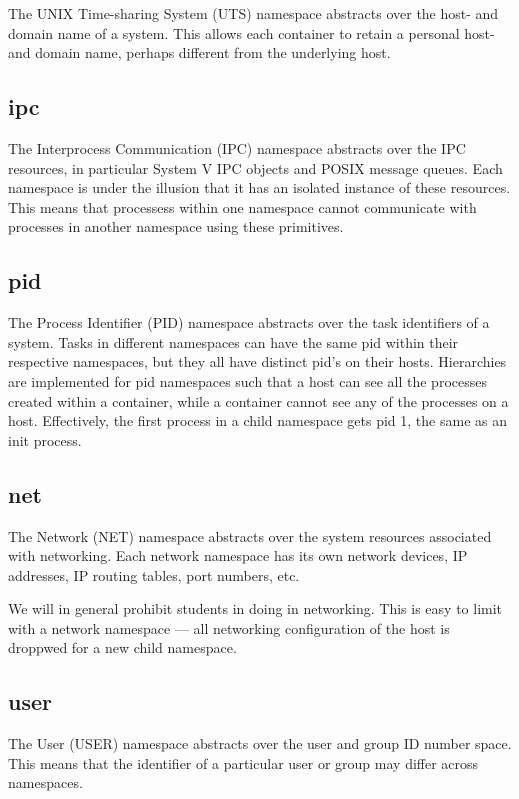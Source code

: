 The UNIX Time-sharing System (UTS) namespace abstracts over the host- and domain
name of a system. This allows each container to retain a personal host- and
domain name, perhaps different from the underlying host.

\subsection{ipc}

The Interprocess Communication (IPC) namespace abstracts over the IPC
resources, in particular System V IPC objects and POSIX message queues. Each
namespace is under the illusion that it has an isolated instance of these
resources. This means that processess within one namespace cannot communicate
with processes in another namespace using these primitives.

\subsection{pid}

The Process Identifier (PID) namespace abstracts over the task identifiers of a
system. Tasks in different namespaces can have the same pid within their
respective namespaces, but they all have distinct pid's on their hosts.
Hierarchies are implemented for pid namespaces such that a host can see all the
processes created within a container, while a container cannot see any of the
processes on a host. Effectively, the first process in a child namespace gets
pid 1, the same as an init process.

\subsection{net}

The Network (NET) namespace abstracts over the system resources associated with
networking. Each network namespace has its own network devices, IP addresses,
IP routing tables, port numbers, etc.

We will in general prohibit students in doing in networking. This is easy to
limit with a network namespace --- all networking configuration of the host is
droppwed for a new child namespace.

\subsection{user}

The User (USER) namespace abstracts over the user and group ID number space.
This means that the identifier of a particular user or group may differ across
namespaces.

